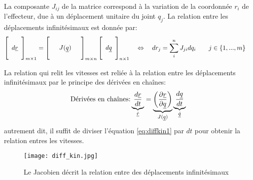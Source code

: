 La composante $J_{ij}$ de la matrice correspond à la variation de la coordonnée $r_i$ de l'effecteur, due à un déplacement unitaire du joint $q_j$. La relation entre les déplacements infinitésimaux est donnée par:
\begin{align}
	\left[ \begin{array}{c}  \\ d\underline{r} \\ \\
	\end{array} \right]_{m \times 1}
	&=
	\left[ \begin{array}{c c c}
			   &&\\
			   & J(\underline{q}) &\\
			   &&
	\end{array} \right]_{m \times n}
	\left[ \begin{array}{c}
			   \\ d\underline{q} \\ \\
	\end{array} \right]_{n \times 1}
	\quad \Leftrightarrow \quad
	dr_j
	= \sum_i^n{
		J_{ji}
		dq_i
	}
	\quad \quad j \in \left\{ 1 , ... , m \right\}
	\label{eq:diffkin1}
\end{align}


La relation qui relit les vitesses est reliée à la relation entre les déplacements infinitésimaux par le principe des dérivées en chaînes:
\begin{equation}
	\text{Dérivées en chaînes:}
	\underbrace{
		\frac{d \underline{r}}{dt}
	}_{\underline{\dot{r}}}
	=
	\underbrace{
		\left( \frac{\partial \underline{r}}{\partial \underline{q}} \right)
	}_{J(\underline{q})}
	\underbrace{
		\frac{d \underline{q}}{dt}
	}_{\underline{\dot{q}}}
\end{equation}
autrement dit, il suffit de diviser l'équation \eqref{eq:diffkin1} par $dt$ pour obtenir la relation entres les vitesses.

\begin{figure}[H]
	\centering
	\texttt{[image: diff\_kin.jpg]}
	\caption{Le Jacobien décrit la relation entre des déplacements infinitésimaux}
	\label{fig:diff_kin_variation}
\end{figure}


